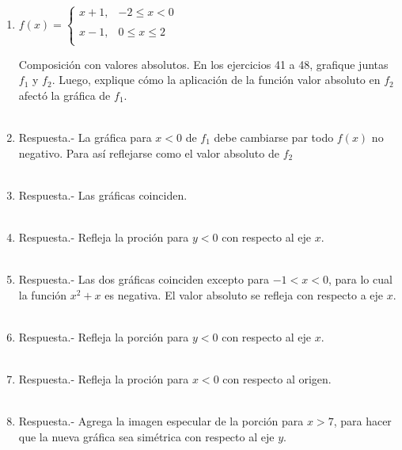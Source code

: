 \begin{enumerate}
\item $f(x) = \left\{\begin{array}{lr}
	x+1,&-2\leq x < 0\\\\
	x-1,&0\leq x \leq 2\\
    \end{array}\right.$
    \vspace{.5cm}

Composición con valores absolutos.\; En los ejercicios 41 a 48, grafique juntas $f_1$ y $f_2$. Luego, explique cómo la aplicación de la función valor absoluto en $f_2$ afectó la gráfica de $f_1$.\\\\

\item Respuesta.-\; La gráfica para $x<0$ de $f_1$ debe cambiarse par todo $f(x)$ no negativo. Para así reflejarse como el valor absoluto de $f_2$\\\\

\item Respuesta.-\; Las gráficas coinciden.\\\\

\item Respuesta.-\; Refleja la proción para $y<0$ con respecto al eje $x$.\\\\

\item Respuesta.-\; Las dos gráficas coinciden excepto para $-1<x<0$, para lo cual la función $x^2 + x$ es negativa. El valor absoluto se refleja con respecto a eje $x$.\\\\

\item Respuesta.-\; Refleja la porción para $y<0$ con respecto al eje $x$.\\\\

\item Respuesta.-\; Refleja la proción para $x<0$ con respecto al origen.\\\\

\item Respuesta.-\; Agrega la imagen especular de la porción para $x> 7$, para hacer que la nueva gráfica sea simétrica con respecto al eje $y$.\\\\


\end{enumerate}

